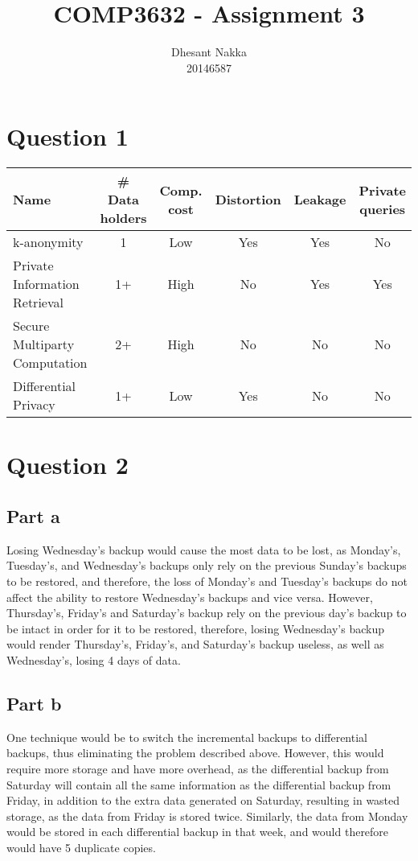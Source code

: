 \documentclass[12pt,a4paper]{article}
\title{COMP3632 - Assignment 3}
\author{Dhesant Nakka\\20146587}
\begin{document}
\maketitle

\section{Question 1}
\begin{table}[H]
  \begin{tabulary}{\textwidth}{L|C|C|C|C|C}
    \hline
    \textbf{Name} & \textbf{\# Data holders} & \textbf{Comp. cost} & \textbf{Distortion} & \textbf{Leakage} & \textbf{Private queries} \\
    \hline
    k-anonymity & 1 & Low & Yes & Yes & No \\
    \hline
    Private Information Retrieval & 1+ & High & No & Yes & Yes \\
    \hline
    Secure Multiparty Computation & 2+ & High & No & No & No \\
    \hline
    Differential Privacy & 1+ & Low & Yes & No & No \\
    \hline
  \end{tabulary}
\end{table}

\section{Question 2}
\subsection{Part a}
Losing Wednesday's backup would cause the most data to be lost, as Monday's, Tuesday's, and Wednesday's backups only rely on the previous Sunday's backups to be restored, and therefore, the loss of Monday's and Tuesday's backups do not affect the ability to restore Wednesday's backups and vice versa. However, Thursday's, Friday's and Saturday's backup rely on the previous day's backup to be intact in order for it to be restored, therefore, losing Wednesday's backup would render Thursday's, Friday's, and Saturday's backup useless, as well as Wednesday's, losing 4 days of data.

\subsection{Part b}
One technique would be to switch the incremental backups to differential backups, thus eliminating the problem described above. However, this would require more storage and have more overhead, as the differential backup from Saturday will contain all the same information as the differential backup from Friday, in addition to the extra data generated on Saturday, resulting in wasted storage, as the data from Friday is stored twice. Similarly, the data from Monday would be stored in each differential backup in that week, and would therefore would have 5 duplicate copies.
\end{document}
